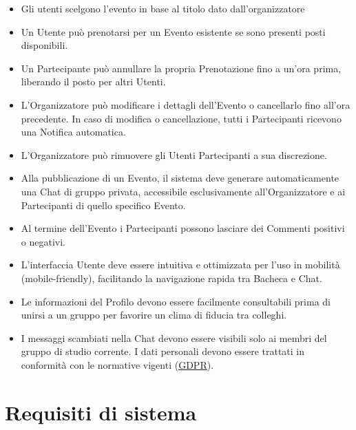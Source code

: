 \documentclass[12pt,a4paper]{report}
\let\oldhref\href
\renewcommand{\href}[2]{\oldhref{#1}{\uline{#2}}}
\begin{document}
\begin{itemize}[leftmargin=*]
    \item Gli utenti scelgono l'evento in base al titolo dato dall'organizzatore
    \item Un Utente può prenotarsi per un Evento esistente se sono presenti posti disponibili.
    \item Un Partecipante può annullare la propria Prenotazione fino a un'ora prima, liberando il posto per altri Utenti.
    \item L'Organizzatore può modificare i dettagli dell'Evento o cancellarlo fino all'ora precedente. In caso di modifica o cancellazione, tutti i Partecipanti ricevono una Notifica automatica.
    \item L'Organizzatore può rimuovere gli Utenti Partecipanti a sua discrezione.
    \item Alla pubblicazione di un Evento, il sistema deve generare automaticamente una Chat di gruppo privata, accessibile esclusivamente all'Organizzatore e ai Partecipanti di quello specifico Evento.
    \item Al termine dell'Evento i Partecipanti possono lasciare dei Commenti positivi o negativi.
    \item L'interfaccia Utente deve essere intuitiva e ottimizzata per l'uso in mobilità (mobile-friendly), facilitando la navigazione rapida tra Bacheca e Chat.
    \item Le informazioni del Profilo devono essere facilmente consultabili prima di unirsi a un gruppo per favorire un clima di fiducia tra colleghi.
    \item I messaggi scambiati nella Chat devono essere visibili solo ai membri del gruppo di studio corrente. I dati personali devono essere trattati in conformità con le normative vigenti (\href{https://gdpr-info.eu/}{GDPR}).
\end{itemize}

\newpage
\section{Requisiti di sistema}
\end{document}
